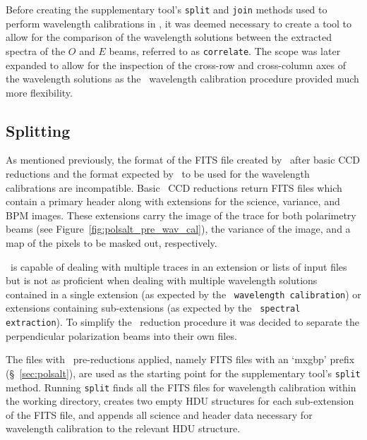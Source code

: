 Before creating the supplementary tool's \texttt{split} and \texttt{join} methods used to perform wavelength calibrations in \iraf, it was deemed necessary to create a tool to allow for the comparison of the wavelength solutions between the extracted spectra of the $O$ and $E$ beams, referred to as \texttt{correlate}. The scope was later expanded to allow for the inspection of the cross-row and cross-column axes of the wavelength solutions as the \iraf\ wavelength calibration procedure provided much more flexibility.


\subsection{Splitting}



As mentioned previously, the format of the \gls{FITS} file created by \polsalt\ after basic \gls{CCD} reductions and the format expected by \iraf\ to be used for the wavelength calibrations are incompatible. Basic \polsalt\ \gls{CCD} reductions return \gls{FITS} files which contain a primary header along with extensions for the science, variance, and \gls{BPM} images. These extensions carry the image of the trace for both polarimetry beams (see Figure~\ref{fig:polsalt_pre_wav_cal}), the variance of the image, and a map of the pixels to be masked out, respectively.

\iraf\ is capable of dealing with multiple traces in an extension or lists of input files but is not as proficient when dealing with multiple wavelength solutions contained in a single extension (as expected by the \polsalt\ \texttt{wavelength calibration}) or extensions containing sub-extensions (as expected by the \polsalt\ \texttt{spectral extraction}). To simplify the \iraf\ reduction procedure it was decided to separate the perpendicular polarization beams into their own files.

The files with \polsalt\ pre-reductions applied, namely \gls{FITS} files with an `mxgbp' prefix (\S~\ref{sec:polsalt}), are used as the starting point for the supplementary tool's \texttt{split} method. Running \texttt{split} finds all the \gls{FITS} files for wavelength calibration within the working directory, creates two empty \gls{HDU} structures for each sub-extension of the \gls{FITS} file, and appends all science and header data necessary for wavelength calibration to the relevant \gls{HDU} structure.

